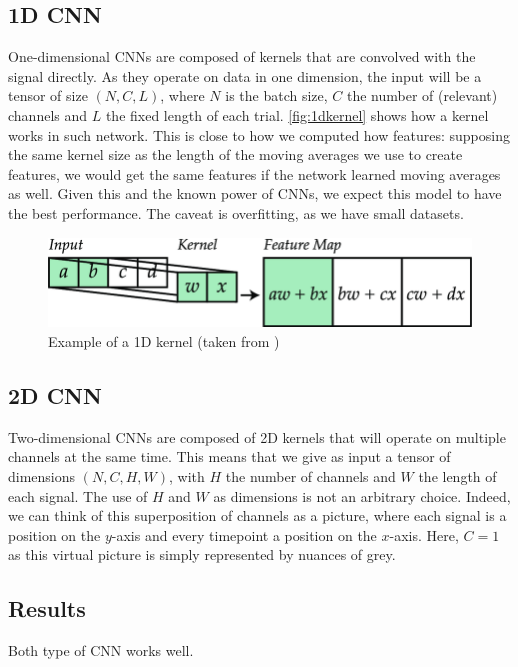 \documentclass[10pt,conference,compsocconf]{IEEEtran}
\begin{document}
\subsection{1D CNN}
One-dimensional CNNs are composed of kernels that are convolved with the signal directly. As they operate on data in one dimension, the input will be a tensor of size \((N, C, L)\), where \(N\) is the batch size, \(C\) the number of (relevant) channels and \(L\) the fixed length of each trial. \autoref{fig:1dkernel} shows how a kernel works in such network. This is close to how we computed how features: supposing the same kernel size as the length of the moving averages we use to create features, we would get the same features if the network learned moving averages as well. Given this and the known power of CNNs, we expect this model to have the best performance. The caveat is overfitting, as we have small datasets.

\begin{figure}[h!]
  \center
  \includegraphics[width=\linewidth]{images/1d_kernel.png}
  \caption{Example of a 1D kernel (taken from \cite{1dkernel})}
  \label{fig:1dkernel}
\end{figure}
\FloatBarrier

\subsection{2D CNN}
Two-dimensional CNNs are composed of 2D kernels that will operate on multiple channels at the same time. This means that we give as input a tensor of dimensions \((N, C, H, W)\), with \(H\) the number of channels and \(W\) the length of each signal. The use of \(H\) and \(W\) as dimensions is not an arbitrary choice. Indeed, we can think of this superposition of channels as a picture, where each signal is a position on the \(y\)-axis and every timepoint a position on the \(x\)-axis. Here, \(C=1\) as this virtual picture is simply represented by nuances of grey.

\subsection{Results}
Both type of CNN works well.
\end{document}
